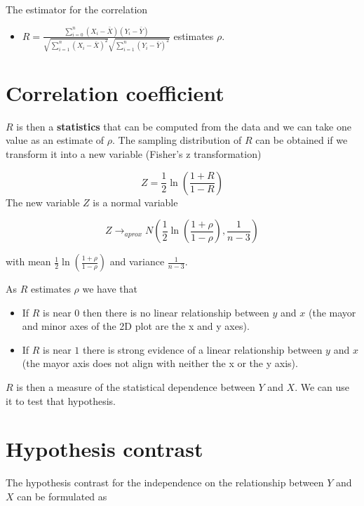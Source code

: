 \documentclass[
]{book}
\providecommand{\tightlist}{%
  \setlength{\itemsep}{0pt}\setlength{\parskip}{0pt}}
\begin{document}
The estimator for the correlation

\begin{itemize}
\tightlist
\item
  \(R=\frac{\sum_{i=0}^n(X_i-\bar{X})(Y_i-\bar{Y})}{\sqrt{\sum_{i=1}^n(X_i-\bar{X})^2}\sqrt{\sum_{i=1}^n(Y_i-\bar{Y})^2}}\) estimates \(\rho\).
\end{itemize}

\hypertarget{correlation-coefficient}{%
\section{Correlation coefficient}\label{correlation-coefficient}}

\(R\) is then a \textbf{statistics} that can be computed from the data and we can take one value as an estimate of \(\rho\). The sampling distribution of \(R\) can be obtained if we transform it into a new variable (Fisher's z transformation)

\[Z=\frac{1}{2}\ln (\frac{1+R}{1-R})\]
The new variable \(Z\) is a normal variable

\[Z \rightarrow_{aprox} N(\frac{1}{2}\ln (\frac{1+\rho}{1-\rho}), \frac{1}{n-3})\]

with mean \(\frac{1}{2}\ln (\frac{1+\rho}{1-\rho})\) and variance \(\frac{1}{n-3}\).

As \(R\) estimates \(\rho\) we have that

\begin{itemize}
\item
  If \(R\) is near \(0\) then there is no linear relationship between \(y\) and \(x\) (the mayor and minor axes of the 2D plot are the x and y axes).
\item
  If \(R\) is near \(1\) there is strong evidence of a linear relationship between \(y\) and \(x\) (the mayor axis does not align with neither the x or the y axis).
\end{itemize}

\(R\) is then a measure of the statistical dependence between \(Y\) and \(X\). We can use it to test that hypothesis.

\hypertarget{hypothesis-contrast}{%
\section{Hypothesis contrast}\label{hypothesis-contrast}}

The hypothesis contrast for the independence on the relationship between \(Y\) and \(X\) can be formulated as
\end{document}
